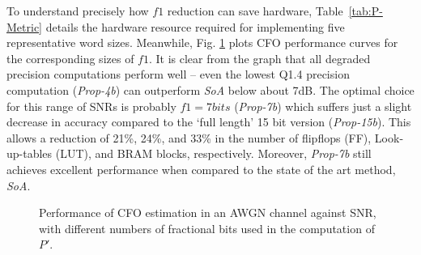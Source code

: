 To understand precisely how $f1$ reduction can save hardware, Table~\ref{tab:P-Metric} details the hardware resource required for implementing five representative word sizes. Meanwhile, Fig. \ref{fig:Fest_AWGN_PQ} plots CFO performance curves for the corresponding sizes of $f1$. It is clear from the graph that all degraded precision computations perform well -- even the lowest Q1.4 precision computation (\textit{Prop-4b}) can outperform \textit{SoA} below about 7dB.
The optimal choice for this range of SNRs is probably $f1=7bits$ (\textit{Prop-7b}) which suffers just a slight decrease in accuracy compared to the `full length' 15 bit version (\textit{Prop-15b}). This allows a reduction of 21\%, 24\%, and 33\% in the number of flipflops (FF), Look-up-tables (LUT), and BRAM blocks, respectively. Moreover, \textit{Prop-7b} still achieves excellent performance when compared to the state of the art method, \textit{SoA}.

\begin{figure}[h]
	\centering
	\caption{Performance of CFO estimation in an AWGN channel against SNR, with different numbers of fractional bits used in the computation of $P'$.}
\label{fig:Fest_AWGN_PQ}
\end{figure}

